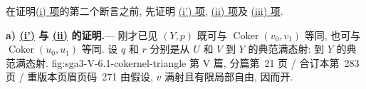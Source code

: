 在证明\hyperref[lem:sga3-V-6.1-i]{(i) 项}的第二个断言之前,
先证明 \hyperref[lem:sga3-V-6.1-ip]{(i') 项},
\hyperref[lem:sga3-V-6.1-ii]{(ii) 项}及 \hyperref[lem:sga3-V-6.1-iii]{(iii) 项}.

\medskip
{}\label{par:sga3-V-6-a}%
\noindent\textbf{a) \hyperref[lem:sga3-V-6.1-ip]{(i')} 与 \hyperref[lem:sga3-V-6.1-ii]{(ii)} 的证明.}---%
刚才已见 \((Y,p)\) 既可与
\(\operatorname{Coker}(v_0,v_1)\) 等同, 也可与
\(\operatorname{Coker}(u_0,u_1)\) 等同.
设 \(q\) 和 \(r\) 分别是从 \(U\) 和 \(V\) 到 \(Y\) 的典范满态射:
  {到 \(Y\) 的典范满态射.}
  {fig:sga3-V-6.1-cokernel-triangle}
  {第 V 篇, 分篇第~21 页 / 合订本第~283 页 / 重版本页眉页码~271}
由假设, \(v\) 满射且有限局部自由, 因而开.

